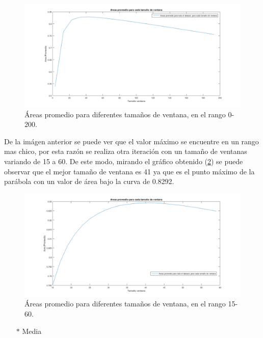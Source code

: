 \begin{figure}[H]
	{
	\centering
	\includegraphics[width=1\textwidth]{Figures/MedianaRangoGrande}
	\caption[Ventana Mediana 0-200]{\'Areas promedio para diferentes tamaños de ventana, en el rango 0-200.}
	\label{fig:MedianaRangoGrande}
	}
\end{figure}	

De la im\'agen anterior se puede ver que el valor m\'aximo se encuentre en un rango mas chico, por esta  raz\'on se realiza otra iteraci\'on con un tamaño de ventanas variando de 15 a 60. De este modo, mirando el gr\'afico obtenido (\ref{fig:MedianaRangoChico}) se puede observar que  el mejor tama\~no de ventana es 41 ya que es el punto m\'aximo de la par\'abola con un valor de \'area bajo la curva de 0.8292.

\begin{figure}[H]
	{
	\centering
	\includegraphics[width=1\textwidth]{Figures/MedianaRangoChico}
	\caption[Ventana Mediana 15-60]{\'Areas promedio para diferentes tamaños de ventana, en el rango 15-60.}
	\label{fig:MedianaRangoChico}
	}
\end{figure}	

\begin{itemize}
	\item[$*$]Media
\end{itemize}

